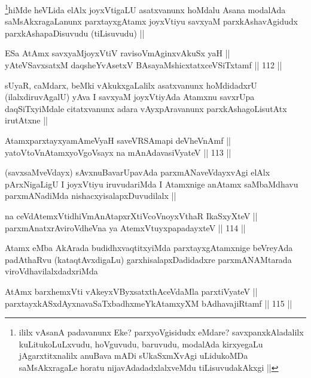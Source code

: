 \begin{artha}
\footnote{ililx vAsanA padavanunx Eke? parxyoVgisidudx eMdare? savxpanxkAladalilx kuLitukoLuLxvudu, hoVguvudu, baruvudu, modalAda kirxyegaLu jAgarxtitxnalilx anuBava mADi sUkaSxmXvAgi uLidukoMDa saMsAkxragaLe horatu nijavAdadadxlalxveMdu tiLisuvudakAkxgi ||}hiMde heVLida elAlx joyxVtigaLU asatxvanunx hoMdalu Asana modalAda saMsAkxragaLanunx parxtayxgAtamx joyxVtiyu savxyaM parxkAshavAgidudx parxkAshapaDisuvudu (tiLisuvudu) ||
\end{artha}

\begin{shl}
ESa AtAmx savxyaMjoyxVtiV ravisoVmAginxvAkuSx yaH ||  \\
yAteVSavxsatxM daqsheYvA\s \s setxV BAsayaMshicxtatxceVSiTxtamf ||  112 ||  
\end{shl}

\begin{artha}
sUyaR, caMdarx, beMki vAkukxgaLalilx asatxvanunx hoMdidadxrU (ilalxdiruvAgalU) yAva I savxyaM joyxVtiyAda Atamxnu savxrUpa daqSiTxyiMdale citatxvanunx adara vAyxpAravanunx parxkAshagoLisutAtx irutAtxne ||
\end{artha}

\begin{shl}
AtamxparxtayxyamAmeVyaH saveVRSAmapi deVheVnAmf || \\
yatoV\s toV\s nAtamxyoVgoV\s sayx na mAnAdavasiVyateV ||  113 ||  
\end{shl}

\begin{artha}
(savxsaMveVdayx) sAvxnuBavarUpavAda parxmANaveVdayxvAgi elAlx pArxNigaLigU I joyxVtiyu iruvudariMda I Atamxnige anAtamx saMbaMdhavu parxmANadiMda nishacxyisalapxDuvudilalx ||
\end{artha}

\begin{shl}
na ceVdAtemxVtidhiVmAnAtapxrXtiVcoVnoyxV\s thaR IkaSxyXteV || \\
parxmAnatxrAviroVdheVna ya AtemxVtuyxpapadayxteV ||  114 ||  
\end{shl}

\begin{artha}
Atamx eMba AkArada budidhxvaqtitxyiMda parxtayxgAtamxnige beVreyAda padAthaRvu (kataqtAvxdigaLu) garxhisalapxDadidadxre parxmANAMtarada viroVdhavilalxdadxriMda 
\end{artha}

\begin{shl}
AtAmx barxhemxVti vAkeyxVByxsatxthAceVdaMla parxtiVyateV || \\
parxtayxkASxdAyxnavaSaTxbadhxmeYkAtamxyXM bAdhavajiRtamf ||  115 ||  
\end{shl}

